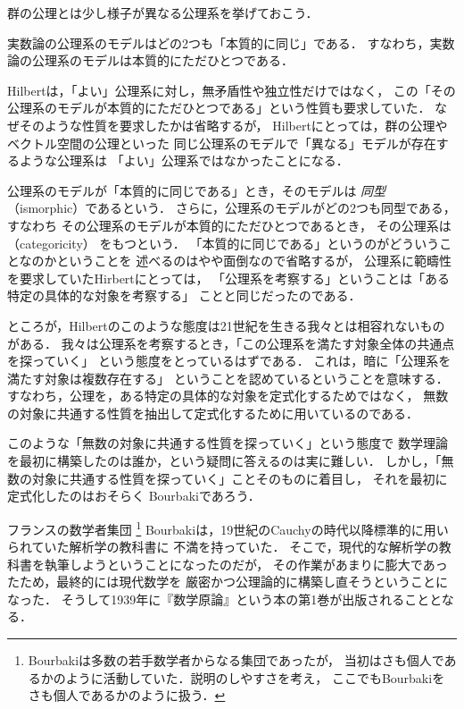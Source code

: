   群の公理とは少し様子が異なる公理系を挙げておこう．

  \begin{ex} \label{ex:hilbertaxiom}
    実数論の公理系のモデルはどの2つも「本質的に同じ」である．
    すなわち，実数論の公理系のモデルは本質的にただひとつである．
  \end{ex}

  Hilbertは，「よい」公理系に対し，無矛盾性や独立性だけではなく，
  この「その公理系のモデルが本質的にただひとつである」という性質も要求していた．
  なぜそのような性質を要求したかは省略するが，
  Hilbertにとっては，群の公理やベクトル空間の公理といった
  同じ公理系のモデルで「異なる」モデルが存在するような公理系は
  「よい」公理系ではなかったことになる．

  公理系のモデルが「本質的に同じである」とき，そのモデルは
  \emph{同型}（ismorphic）であるという．
  さらに，公理系のモデルがどの2つも同型である，すなわち
  その公理系のモデルが本質的にただひとつであるとき，
  その公理系は
  \emph{}（categoricity）
  をもつという．
  「本質的に同じである」というのがどういうことなのかということを
  述べるのはやや面倒なので省略するが，
  公理系に範疇性を要求していたHirbertにとっては，
  「公理系を考察する」ということは「ある特定の具体的な対象を考察する」
  ことと同じだったのである．

  ところが，Hilbertのこのような態度は21世紀を生きる我々とは相容れないものがある．
  我々は公理系を考察するとき，「この公理系を満たす対象全体の共通点を探っていく」
  という態度をとっているはずである．
  これは，暗に「公理系を満たす対象は複数存在する」
  ということを認めているということを意味する．
  すなわち，公理を，ある特定の具体的な対象を定式化するためではなく，
  無数の対象に共通する性質を抽出して定式化するために用いているのである．
  
  このような「無数の対象に共通する性質を探っていく」という態度で
  数学理論を最初に構築したのは誰か，という疑問に答えるのは実に難しい．
  しかし，「無数の対象に共通する性質を探っていく」ことそのものに着目し，
  それを最初に定式化したのはおそらく
  Bourbakiであろう．

  フランスの数学者集団
  \footnote{Bourbakiは多数の若手数学者からなる集団であったが，
    当初はさも個人であるかのように活動していた．説明のしやすさを考え，
    ここでもBourbakiをさも個人であるかのように扱う．}
  Bourbakiは，19世紀のCauchyの時代以降標準的に用いられていた解析学の教科書に
  不満を持っていた．
  そこで，現代的な解析学の教科書を執筆しようということになったのだが，
  その作業があまりに膨大であったため，最終的には現代数学を
  厳密かつ公理論的に構築し直そうということになった．
  そうして1939年に『数学原論』という本の第1巻が出版されることとなる．

